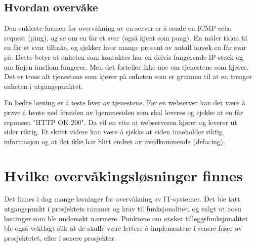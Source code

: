 \subsection{Hvordan overvåke}
Den enkleste formen for overvåkning av en server er å sende en ICMP echo request (ping), og se om en får et svar (også kjent som pong). En måler tiden til en får et svar tilbake, og sjekker hvor mange prosent av antall forsøk en får svar på. Dette betyr at enheten som kontaktes har en delvis fungerende IP-stack og om linjen imellom fungerer. Men det forteller ikke noe om tjenestene som kjører. Det er tross alt tjenestene som kjører på enheten som er grunnen til at en trenger enheten i utgangspunktet.

En bedre løsning er å teste hver av tjenestene. For en webserver kan det være å prøve å hente ned forsiden av hjemmesiden som skal leveres og sjekke at en får reponsen "HTTP OK 200". Da vil en vite at webserveren kjører og leverer ut sider riktig. Et skritt videre kan være å sjekke at siden inneholder riktig informasjon og at det ikke har blitt endret av uvedkommende (defacing).

\section{Hvilke overvåkingsløsninger finnes}\label{sec:hvilkefinnes}
Det finnes i dag mange løsninger for overvåkning av IT-systemer\cite{wiki:networkmonitoring}. Det ble tatt utgangspunkt i prosjektets rammer og krav til funksjonalitet, og valgt ut noen løsninger som ble undersøkt nærmere. Punktene om ønsket tilleggsfunksjonalitet ble også vektlagt slik at de skulle være lettere å implementere i senere faser av prosjektetet, eller i senere prosjekter. 

